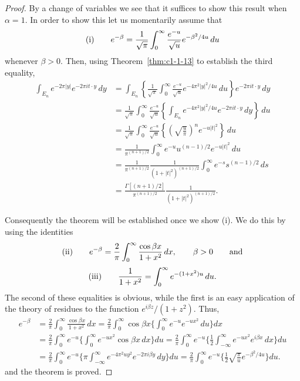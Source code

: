 \begin{proof}
By a change of variables we see that it suffices to show this result when
$\alpha = 1$. In order to show this let us momentarily assume that
\[
\textup{(i)}\qquad
e^{-\beta}=\frac{1}{\sqrt{\pi}}\int_{0}^{\infty}\frac{e^{-u}}{\sqrt{u}}e^{-\beta^{2}/4u}\,du
\]
whenever $\beta > 0$. Then, using Theorem~\ref{thm:c1-1-13} to establish the
third equality,
\begin{align*}
\int_{E_{n}}e^{-2\pi|y|}e^{-2\pi i t\cdot y}\,dy
&=\int_{E_{n}}\left\{\frac{1}{\sqrt{\pi}}\int_{0}^{\infty}\frac{e^{-u}}{\sqrt{u}}e^{-4\pi^{2}|y|^{2}/4u}\,du\right\}e^{-2\pi i t\cdot y}\,dy\\
&=\frac{1}{\sqrt{\pi}}\int_{0}^{\infty}\frac{e^{-u}}{\sqrt{u}}\left\{\int_{E_{n}}e^{-4\pi^{2}|y|^{2}/4u}e^{-2\pi i t\cdot y}\,dy\right\}\,du\\
&=\frac{1}{\sqrt{\pi}}\int_{0}^{\infty}\frac{e^{-u}}{\sqrt{u}}\left\{\left(\sqrt{\frac{u}{\pi}}\right)^{n}e^{-u|t|^{2}}\right\}\,du\\
&=\frac{1}{\pi^{(n+1)/2}}\int_{0}^{\infty}e^{-u}u^{(n-1)/2}e^{-u|t|^{2}}\,du\\
&=\frac{1}{\pi^{(n+1)/2}}\frac{1}{(1+|t|^{2})^{(n+1)/2}}\int_{0}^{\infty}e^{-s}s^{(n-1)/2}\,ds\\
&=\frac{\Gamma[(n+1)/2]}{\pi^{(n+1)/2}}\frac{1}{(1+|t|^{2})^{(n+1)/2}}.
\end{align*}

Consequently the theorem will be established once we show (i). We do this by
using the identities
\[
\textup{(ii)}\qquad
e^{-\beta}=\frac{2}{\pi}\int_{0}^{\infty}\frac{\cos\beta x}{1+x^{2}}\,dx,\qquad\beta>0
\qquad\text{and}
\]
\[
\textup{(iii)}\qquad
\frac{1}{1+x^{2}}=\int_{0}^{\infty}e^{-(1+x^{2})u}\,du.
\]
The second of these equalities is obvious, while the first is an easy
application of the theory of residues to the function $e^{i\beta z}/(1 + z^{2})$.
Thus,
\begin{align*}
e^{-\beta}&=\frac{2}{\pi}\int_{0}^{\infty}\frac{\cos\beta x}{1+x^{2}}\,dx
=\frac{2}{\pi}\int_{0}^{\infty}\cos\beta x\Biggl\{\int_{0}^{\infty}e^{-u}e^{-ux^{2}}\,du\Biggr\}dx\\
&=\frac{2}{\pi}\int_{0}^{\infty}e^{-u}\Biggl\{\int_{0}^{\infty}e^{-ux^{2}}\cos\beta x\,dx\Biggr\}du
=\frac{2}{\pi}\int_{0}^{\infty}e^{-u}\Biggl\{\frac{1}{2}\int_{-\infty}^{\infty}e^{-ux^{2}}e^{i\beta x}\,dx\Biggr\}du\\
&=\frac{2}{\pi}\int_{0}^{\infty}e^{-u}\Biggl\{\pi\int_{-\infty}^{\infty}e^{-4\pi^{2}uy^{2}}e^{-2\pi i\beta y}\,dy\Biggr\}du
=\frac{2}{\pi}\int_{0}^{\infty}e^{-u}\Biggl\{\frac{1}{2}\sqrt{\frac{\pi}{u}}e^{-\beta^{2}/4u}\Biggr\}du.
\end{align*}
and the theorem is proved.
\end{proof}

